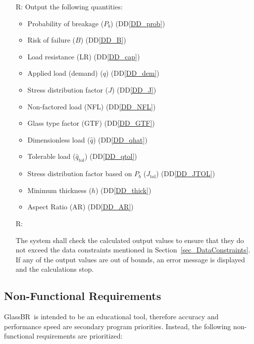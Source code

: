 \documentclass[12pt]{article}
\newcommand{\ddref}[1]{DD\ref{#1}}
\newcounter{reqnum} %
\newcommand{\progname}{GlassBR}
\begin{document}
\begin{itemize}
\item[R\refstepcounter{reqnum}\thereqnum \label{R_Output}:]
  Output the following quantities:
\begin{itemize}
\item Probability of breakage ($P_b$) (\ddref{DD_prob})
\item Risk of failure ($B$) (\ddref{DD_B})
\item Load resistance (LR) (\ddref{DD_cap})
\item Applied load (demand) ($q$) (\ddref{DD_dem})
\item Stress distribution factor ($J$) (\ddref{DD_J})
\item Non-factored load (NFL) (\ddref{DD_NFL})
\item Glass type factor (GTF) (\ddref{DD_GTF})
\item Dimensionless load ($\hat{q}$) (\ddref{DD_qhat})
\item Tolerable load ($\hat{q}_{\text{tol}}$) (\ddref{DD_qtol})
\item Stress distribution factor based on $P_b$ ($J_{\text{tol}}$) (\ddref{DD_JTOL})
\item Minimum thickness ($h$) (\ddref{DD_thick})
\item Aspect Ratio (AR) (\ddref{DD_AR})
\end{itemize}

\item[R\refstepcounter{reqnum}\thereqnum \label{Verify_OUT}:]

The system shall check the calculated output values to ensure that they do not
exceed the data constraints mentioned in Section~\ref{sec_DataConstraints}.  If any of
the output values are out of bounds, an error message is displayed and the
calculations stop.
\end{itemize}

\subsection{Non-Functional Requirements}

\progname\ is intended to be an educational tool, therefore accuracy and
performance speed are secondary program priorities. Instead, the following 
non-functional requirements are prioritized:

\end{document}

